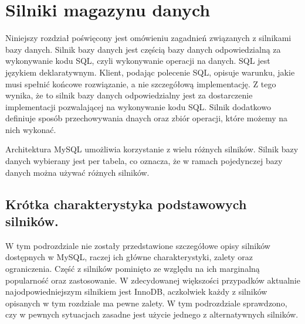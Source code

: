 \section{Silniki magazynu danych}
Niniejszy rozdział poświęcony jest omówieniu zagadnień związanych z silnikami bazy danych. Silnik bazy danych jest częścią bazy danych odpowiedzialną za wykonywanie kodu SQL, czyli wykonywanie operacji na danych. SQL jest językiem deklaratywnym. Klient, podając polecenie SQL, opisuje warunku, jakie musi spełnić końcowe rozwiązanie, a nie szczegółową implementację. Z tego wynika, że to silnik bazy danych odpowiedzialny jest za dostarczenie implementacji pozwalającej na wykonywanie kodu SQL. Silnik dodatkowo definiuje sposób przechowywania dnaych oraz zbiór operacji, które możemy na nich wykonać.

Architektura MySQL umożliwia korzystanie z wielu różnych silników. Silnik bazy danych wybierany jest per tabela, co oznacza, że w ramach pojedynczej bazy danych można używać różnych silników.
\subsection{Krótka charakterystyka podstawowych silników.}
W tym podrozdziale nie zostały przedstawione szczegółowe opisy silników dostępnych w MySQL, raczej ich główne charakterystyki, zalety oraz ograniczenia. Część z silników pominięto ze względu na ich marginalną popularność oraz zastosowanie. W zdecydowanej większości przypadków aktualnie najodpowiedniejszym silnikiem jest InnoDB, aczkolwiek każdy z silników opisanych w tym rozdziale ma pewne zalety. W tym podrozdziale sprawdzono, czy w pewnych sytuacjach zasadne jest użycie jednego z alternatywnych silników.
